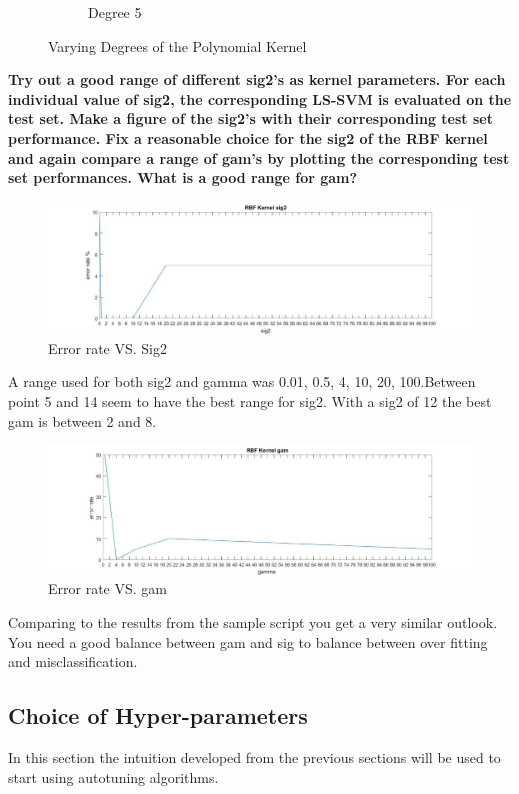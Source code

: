\documentclass[11pt,oneside,a4paper]{article}
\begin{document}
\begin{figure}[H]
\begin{subfigure}[b]{0.4\textwidth}
	\caption{Degree 5}
\end{subfigure}
\caption{Varying Degrees of the Polynomial Kernel}
\end{figure}
\textbf{Try out a good range of
different sig2’s as kernel parameters. For each individual value of sig2, the corresponding LS-SVM
is evaluated on the test set. Make a figure of the sig2’s with their corresponding test set performance. Fix a reasonable choice for the sig2 of the RBF
kernel and again compare a range of gam’s by plotting the corresponding test set performances. What
is a good range for gam?}\\
\begin{figure}[H]
	\centering
	\includegraphics[scale=0.4]{../Figures/RBF_sig2}
	\caption{Error rate VS. Sig2}
\end{figure}
A range used for both sig2 and gamma was 0.01, 0.5, 4, 10, 20, 100.Between point 5 and 14 seem to have the best range for sig2. With a sig2 of 12 the best gam is between 2 and 8.   
\begin{figure}[H]
	\centering
	\includegraphics[scale=0.4]{../Figures/RBF_gam}
	\caption{Error rate VS. gam}
\end{figure}

Comparing to the results from the sample script you get a very similar outlook. You need a good balance between gam and sig to balance between over fitting and misclassification. 

\subsection{Choice of Hyper-parameters}
In this section the intuition developed from the previous sections will be used to start using autotuning algorithms. \\
\end{document}
